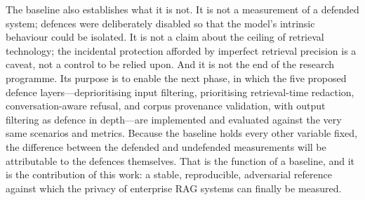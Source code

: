 \documentclass[11pt,a4paper]{article}
\begin{document}
The baseline also establishes what it is not. It is not a measurement of a defended system; defences were deliberately disabled so that the model's intrinsic behaviour could be isolated. It is not a claim about the ceiling of retrieval technology; the incidental protection afforded by imperfect retrieval precision is a caveat, not a control to be relied upon. And it is not the end of the research programme. Its purpose is to enable the next phase, in which the five proposed defence layers---deprioritising input filtering, prioritising retrieval-time redaction, conversation-aware refusal, and corpus provenance validation, with output filtering as defence in depth---are implemented and evaluated against the very same scenarios and metrics. Because the baseline holds every other variable fixed, the difference between the defended and undefended measurements will be attributable to the defences themselves. That is the function of a baseline, and it is the contribution of this work: a stable, reproducible, adversarial reference against which the privacy of enterprise RAG systems can finally be measured.
\end{document}
